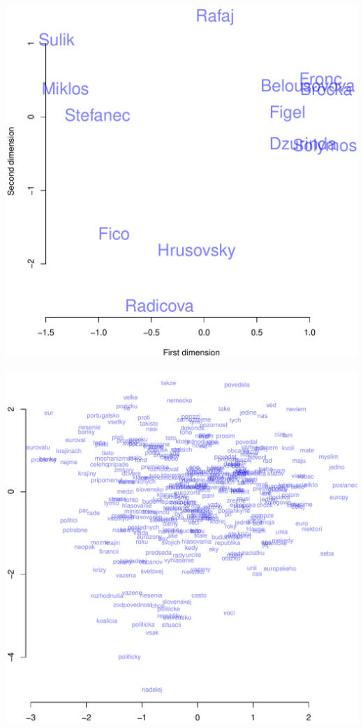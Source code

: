 \documentclass[20pt]{beamer}
\begin{document}
\begin{frame}
    \includegraphics[width=\paperheight]{pv1.pdf}
\end{frame}


\begin{frame}
    \includegraphics[width=\paperheight]{pv2.pdf}
\end{frame}
\end{document}
